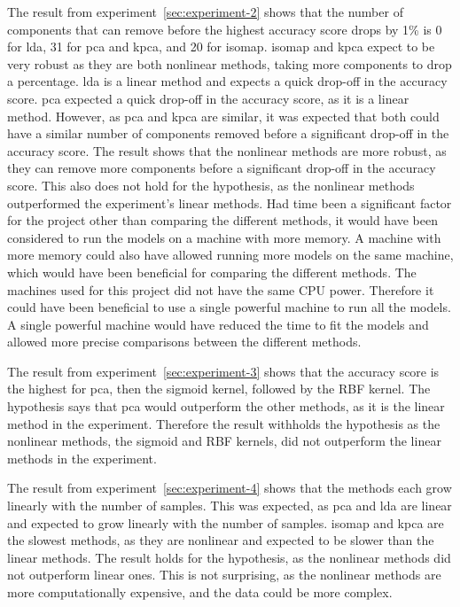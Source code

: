 The result from experiment~\ref{sec:experiment-2} shows that the number of components that can remove before the highest accuracy score drops by 1\% is 0 for \gls{lda}, 31 for \gls{pca} and \gls{kpca}, and 20 for \gls{isomap}. \gls{isomap} and \gls{kpca} expect to be very robust as they are both nonlinear methods, taking more components to drop a percentage. \gls{lda} is a linear method and expects a quick drop-off in the accuracy score. \gls{pca} expected a quick drop-off in the accuracy score, as it is a linear method. However, as \gls{pca} and \gls{kpca} are similar, it was expected that both could have a similar number of components removed before a significant drop-off in the accuracy score. The result shows that the nonlinear methods are more robust, as they can remove more components before a significant drop-off in the accuracy score. This also does not hold for the hypothesis, as the nonlinear methods outperformed the experiment's linear methods. Had time been a significant factor for the project other than comparing the different methods, it would have been considered to run the models on a machine with more memory. A machine with more memory could also have allowed running more models on the same machine, which would have been beneficial for comparing the different methods. The machines used for this project did not have the same CPU power. Therefore it could have been beneficial to use a single powerful machine to run all the models. A single powerful machine would have reduced the time to fit the models and allowed more precise comparisons between the different methods.

The result from experiment~\ref{sec:experiment-3} shows that the accuracy score is the highest for \gls{pca}, then the sigmoid kernel, followed by the RBF kernel. The hypothesis says that \gls{pca} would outperform the other methods, as it is the linear method in the experiment. Therefore the result withholds the hypothesis as the nonlinear methods, the sigmoid and RBF kernels, did not outperform the linear methods in the experiment. 

The result from experiment~\ref{sec:experiment-4} shows that the methods each grow linearly with the number of samples. This was expected, as \gls{pca} and \gls{lda} are linear and expected to grow linearly with the number of samples. \gls{isomap} and \gls{kpca} are the slowest methods, as they are nonlinear and expected to be slower than the linear methods. The result holds for the hypothesis, as the nonlinear methods did not outperform linear ones. This is not surprising, as the nonlinear methods are more computationally expensive, and the data could be more complex.

